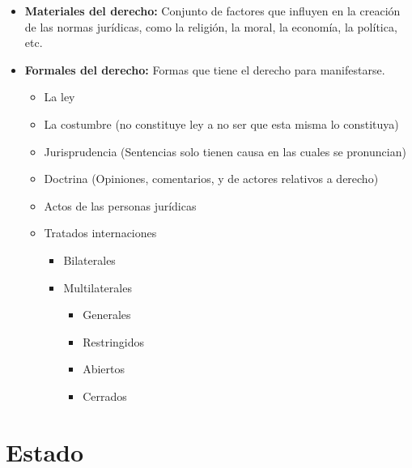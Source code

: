 \documentclass{templateNote}
\begin{document}
\begin{itemize}
    \item \textbf{Materiales del derecho:} Conjunto de factores que influyen en la creación de las normas jurídicas, como la religión, la moral, la economía, la política, etc.
    \item \textbf{Formales del derecho:} Formas que tiene el derecho para manifestarse.
    \begin{itemize}
        \item La ley
        \item La costumbre (no constituye ley a no ser que esta misma lo constituya)
        \item Jurisprudencia (Sentencias solo tienen causa en las cuales se pronuncian)
        \item Doctrina (Opiniones, comentarios, y de actores relativos a derecho)
        \item Actos de las personas jurídicas 
        \item Tratados internaciones
        \begin{itemize}
            \item Bilaterales
            \item Multilaterales
            
            \vspace*{0.4cm}
            \begin{minipage}{0.45\textwidth}
                \begin{itemize}
                    \item Generales
                    \item Restringidos
                \end{itemize}
            \end{minipage}
            \hfill
            \begin{minipage}{0.45\textwidth}
                \begin{itemize}
                    \item Abiertos 
                    \item Cerrados
                \end{itemize}
            \end{minipage}
        \end{itemize}
    \end{itemize}
\end{itemize}

\newpage
\section{Estado}
\end{document}
